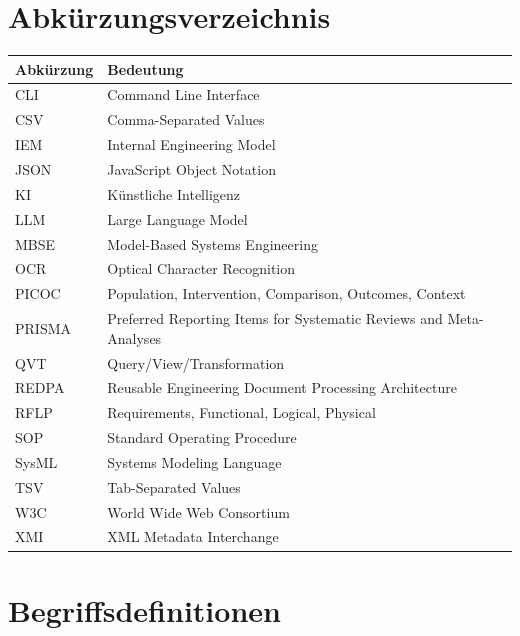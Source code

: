 \section*{Abkürzungsverzeichnis}
{}

\renewcommand{\arraystretch}{1.2}
\begin{xltabular}{\textwidth}{p{3.0cm}X}
\textbf{Abkürzung} & \textbf{Bedeutung} \\
\hline

CLI    & Command Line Interface \\
CSV    & Comma-Separated Values \\
IEM    & Internal Engineering Model \\
JSON   & JavaScript Object Notation \\
KI     & Künstliche Intelligenz \\
LLM    & Large Language Model \\
MBSE   & Model-Based Systems Engineering \\
OCR    & Optical Character Recognition \\
PICOC  & Population, Intervention, Comparison, Outcomes, Context \\
PRISMA & Preferred Reporting Items for Systematic Reviews and Meta-Analyses \\
QVT    & Query/View/Transformation \\
REDPA  & Reusable Engineering Document Processing Architecture \\
RFLP   & Requirements, Functional, Logical, Physical \\
SOP    & Standard Operating Procedure \\
SysML  & Systems Modeling Language \\
TSV    & Tab-Separated Values \\
W3C    & World Wide Web Consortium \\
XMI    & XML Metadata Interchange \\

\end{xltabular}

\newpage

\section*{Begriffsdefinitionen}
{}

